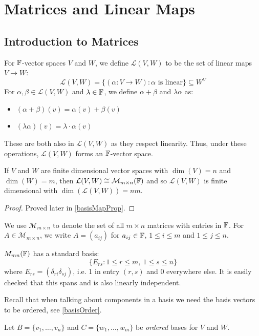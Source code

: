 \documentclass[../main.tex]{subfiles}
\begin{document}
\chapter{Matrices and Linear Maps}
\section{Introduction to Matrices}
For $\mathbb{F}$-vector spaces $V$ and $W$, we define $\mathcal{L}(V, W)$ to be the set of linear maps $V \to W$:
\[
  \mathcal{L}(V, W) = \{(\alpha: V \to W): \alpha \text{ is linear}\} \subseteq W^V
\]
For $\alpha, \beta \in \mathcal{L}(V, W)$ and $\lambda \in \mathbb{F}$, we define $\alpha + \beta$ and $\lambda \alpha$ as:
\begin{itemize}
  \item $(\alpha + \beta)(v) = \alpha(v) + \beta(v)$
  \item $(\lambda \alpha)(v) = \lambda \cdot \alpha(v)$
\end{itemize}
These are both also in $\mathcal{L}(V, W)$ as they respect linearity.
Thus, under these operations, $\mathcal{L}(V, W)$ forms an $\mathbb{F}$-vector space.
\begin{theorem}
  If $V$ and $W$ are finite dimensional vector spaces with $\dim(V) = n$ and $\dim(W) = m$, then $\mathcal{L}(V, W) \cong \mathcal{M}_{m \times n}(\mathbb{F})$ and so $\mathcal{L}(V, W)$ is finite dimensional with $\dim(\mathcal{L}(V, W)) = nm$. \label{LDim}
\end{theorem}
\begin{proof}
  Proved later in \cref{basisMapProp}.
\end{proof}
\begin{remark}[Notation]
  We use $\mathcal{M}_{m \times n}$ to denote the set of all $m \times n$ matrices with entries in $\mathbb{F}$.
  For $A \in \mathcal{M}_{m \times n}$, we write $A = (a_{i j})$ for $a_{i j} \in \mathbb{F}$, $1 \leq i \leq m$ and $1 \leq j \leq n$.

  $M_{m n}(\mathbb{F})$ has a standard basis:
  \[
    \{E_{r s}: 1 \leq r \leq m,\ 1 \leq s \leq n\}
  \]
  where $E_{r s} = (\delta_{r i}\delta_{s j})$, i.e. 1 in entry $(r, s)$ and 0 everywhere else.
  It is easily checked that this spans and is also linearly independent.
\end{remark}
\begin{remark}[Recap]
  Recall that when talking about components in a basis we need the basis vectors to be ordered, see \cref{basisOrder}.
\end{remark}
Let $B = \{v_1, \ldots, v_n\}$ and $C = \{w_1, \ldots, w_m\}$ be \textit{ordered} bases for $V$ and $W$.
\end{document}
